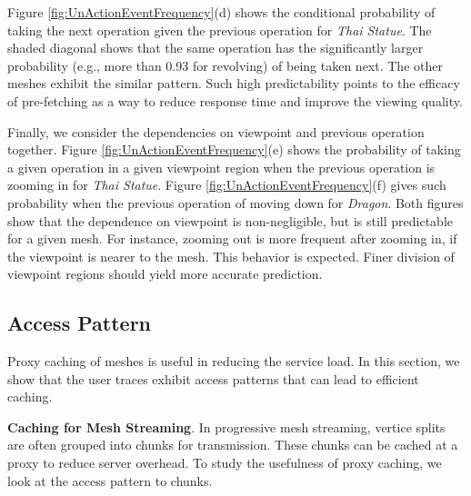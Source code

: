 Figure \ref{fig:UnActionEventFrequency}(d) shows the conditional 
probability of taking the next operation given the previous operation 
for \textit{Thai Statue}.
The shaded diagonal shows that the same operation has the significantly larger probability (e.g., more than 0.93 for revolving) of being taken next.
The other meshes exhibit the similar pattern. 
Such high predictability points to the efficacy of pre-fetching as a
way to reduce response time and improve the viewing quality. 


Finally, we consider the dependencies on viewpoint and previous
operation together.  
Figure \ref{fig:UnActionEventFrequency}(e) shows the
probability of taking a given operation in a given viewpoint region
when the previous operation is zooming in for \textit{Thai
Statue}.  
Figure \ref{fig:UnActionEventFrequency}(f) gives such probability 
when the previous operation of moving down for \textit{Dragon}. Both
figures show that the dependence on viewpoint is non-negligible, but 
is still predictable for a given mesh.  
For instance, zooming out is more frequent after zooming in, 
if the viewpoint is nearer to the mesh.  
This behavior is expected.  Finer division of viewpoint regions should yield more accurate prediction.

\subsection{Access Pattern}
Proxy caching of meshes is useful in reducing the service load.  
In this section, we show that the user traces exhibit access
patterns that can lead to efficient caching.

\textbf{Caching for Mesh Streaming}.
In progressive mesh streaming, vertice splits are often grouped into chunks
for transmission. These chunks can be cached at a proxy to reduce server overhead.
To study the usefulness of proxy caching, we look at the access pattern to chunks. 

